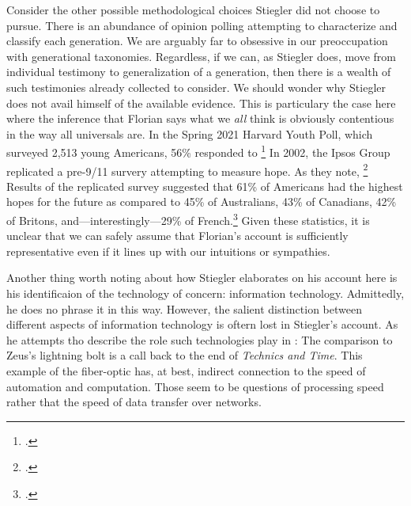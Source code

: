 \documentclass[letterpaper,notitlepage,12pt]{article}
\begin{document}
Consider the other possible methodological choices Stiegler did not choose to
pursue.
There is an abundance of opinion polling attempting to characterize and classify
each generation.
We are arguably far to obsessive in our preoccupation with generational
taxonomies.
Regardless, if we can, as Stiegler does, move from individual testimony to
generalization of a generation, then there is a wealth of such testimonies
already collected to consider.
We should wonder why Stiegler does not avail himself of the available evidence.
This is particulary the case here where the inference that Florian says what we
\textit{all} think is obviously contentious in the way all universals are.
In the Spring 2021 Harvard Youth Poll, which surveyed 2,513 young Americans,
56\% responded  to \footcite{noauthor_spring_nodate}
In 2002, the  Ipsos Group replicated a pre-9/11 survery attempting to measure
hope.
As they note, \footcite{noauthor_measuring_2002}
Results of the replicated survey suggested that 61\% of Americans had the
highest hopes for the future as compared to 45\% of Australians, 43\% of
Canadians, 42\% of Britons, and---interestingly---29\% of
French.\footcite{noauthor_measuring_2002}
Given these statistics, it is unclear that we can safely assume that Florian's
account is sufficiently representative even if it lines up with our intuitions
or sympathies.

Another thing worth noting about how Stiegler elaborates on his account here is
his identificaion of the technology of concern: information technology.
Admittedly, he does no phrase it in this way.
However, the salient distinction between different aspects of information
technology is oftern lost in Stiegler's account.
As he attempts tho describe the role such technologies play in
: 
The comparison to Zeus's lightning bolt is a call back to the end of
\textit{Technics and Time}.
This example of the fiber-optic has, at best, indirect connection to the speed
of automation and computation.
Those seem to be questions of processing speed rather that the speed of data
transfer over networks.
\end{document}
